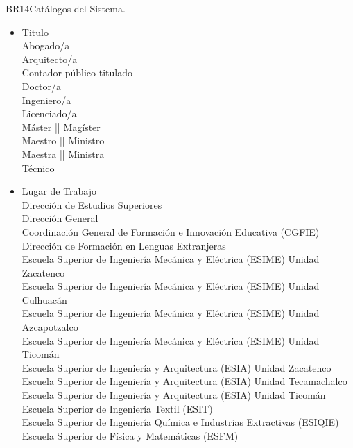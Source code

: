 \begin{BussinesRule}{BR14}{Catálogos del Sistema.}
\begin{itemize}
            Docente\\
            Director de Educación Superiores\\
            Directora de Educación Superiores
        \item Titulo\\
            Abogado/a\\
            Arquitecto/a\\
            Contador público titulado\\
            Doctor/a\\
            Ingeniero/a\\
            Licenciado/a\\
            Máster || Magíster\\
            Maestro || Ministro\\
            Maestra || Ministra\\
            Técnico
        \item Lugar de Trabajo\\
            Dirección de Estudios Superiores\\
            Dirección General\\
            Coordinación General de Formación e Innovación Educativa (CGFIE)\\
            Dirección de Formación en Lenguas Extranjeras\\
            Escuela Superior de Ingeniería Mecánica y Eléctrica (ESIME) Unidad Zacatenco \\
            Escuela Superior de Ingeniería Mecánica y Eléctrica (ESIME) Unidad Culhuacán \\
            Escuela Superior de Ingeniería Mecánica y Eléctrica (ESIME) Unidad Azcapotzalco \\
            Escuela Superior de Ingeniería Mecánica y Eléctrica (ESIME) Unidad Ticomán \\
            Escuela Superior de Ingeniería y Arquitectura (ESIA) Unidad Zacatenco \\
            Escuela Superior de Ingeniería y Arquitectura (ESIA) Unidad Tecamachalco \\
            Escuela Superior de Ingeniería y Arquitectura (ESIA) Unidad Ticomán \\
            Escuela Superior de Ingeniería Textil (ESIT) \\
            Escuela Superior de Ingeniería Química e Industrias Extractivas (ESIQIE) \\
            Escuela Superior de Física y Matemáticas (ESFM) \\

\end{itemize}
\end{BussinesRule}
